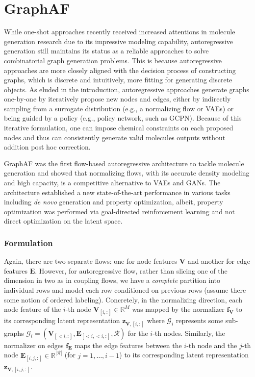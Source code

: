 \section{GraphAF}
While one-shot approaches recently received increased attentions in molecule
generation research due to its impressive modeling capability, autoregressive
generation still maintains its status as a reliable approaches to solve
combinatorial graph generation problems. This is because autoregressive
approaches are more closely aligned with the decision process of constructing
graphs, which is discrete and intuitively, more fitting for generating discrete
objects. As eluded in the introduction, autoregressive approaches generate
graphs one-by-one by iteratively propose new nodes and edges, either by
indirectly sampling from a surrogate distribution (e.g., a normalizing flow or
VAEs) or being guided by a policy (e.g., policy network, such as GCPN). Because
of this iterative formulation, one can impose chemical constraints on each
proposed nodes and thus can consistently generate valid molecules outputs
without addition post hoc correction.

GraphAF \citep{shiGraphAFFlowbasedAutoregressive2020} was the first flow-based
autoregressive architecture to tackle molecule generation and showed that
normalizing flows, with its accurate density modeling and high capacity, is a
competitive alternative to VAEs and GANs. The architecture established a new
state-of-the-art performance in various tasks including \textit{de
novo} generation and property optimization, albeit, property
optimization was performed via goal-directed reinforcement learning and not
direct optimization on the latent space.

\subsubsection{Formulation}

Again, there are two separate flows: one for node features $\mathbf{V}$ and
another for edge features $\mathbf{E}$. However, for autoregressive flow, rather
than slicing one of the dimension in two as in coupling flows, we have a
\textit{complete} partition into individual rows and model each row conditioned
on previous rows (assume there some notion of ordered labeling). Concretely, in
the normalizing direction, each node feature of the $i$-th node
$\mathbf{V}_{[i,:]} \in \mathbb{R}^{M}$ was mapped by the normalizer
$\mathbf{f}_{\mathbf{V}}$ to its corresponding latent representation
$\mathbf{z}_{\mathbf{V}, [i,:]}$ where $\mathcal{G}_{i}$ represents some
sub-graphs $\mathcal{G}_{i} = (\mathbf{V}_{[<i,:]}, \mathbf{E}_{[<i,<i,:]},
\mathcal{R})$ for the $i$-th nodes. Similarly, the normalizer on edges
$\mathbf{f}_{\mathbf{E}}$ maps the edge features between the $i$-th node and the
$j$-th node $\mathbf{E}_{[i,j,:]} \in \mathbb{R}^{|\mathcal{R}|}$ (for
$j=1,\ldots, i-1$)  to its corresponding latent representation
$\mathbf{z}_{\mathbf{V}, [i,j,:]}$.


